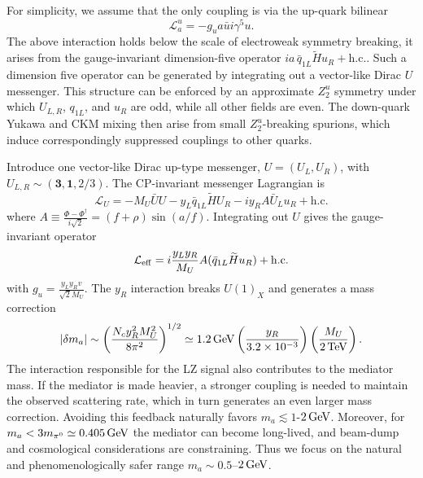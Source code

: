 \documentclass[notitlepage,floats,aps,nofootinbib,preprintnumbers,twocolumn,prl,10pt,balancelastpage]{revtex4-1}
\def\beq{\begin{equation}\begin{aligned}}
\def\eeq{\end{aligned}\end{equation}}
\newcommand{\Lag}{\mathcal L}
\begin{document}
For simplicity, we assume that the only coupling is via the up-quark bilinear
\begin{equation}
 \Lag_a^u=-g_u a\bar u i\gamma^5u.
 \label{eq:uonly}
\end{equation}
%
The above interaction holds below the scale of electroweak symmetry breaking, it arises from the gauge-invariant dimension-five operator \(ia\,\bar q_{1L}\widetilde H u_R+\mathrm{h.c.}\). Such a dimension five operator can be generated by integrating out a vector-like Dirac \(U\) messenger.
%
%
This structure can be enforced by an approximate $Z_2^u$ symmetry under
which $U_{L,R}$, $q_{1L}$, and $u_R$ are odd, while all other fields are
even.  The down-quark Yukawa and CKM mixing then arise from small
$Z_2^u$-breaking spurions, which induce correspondingly suppressed
couplings to other quarks.


Introduce one vector-like Dirac up-type messenger,
$U=(U_L,U_R)$, with $U_{L,R}\sim(\bm3,\bm1,2/3)$.
The CP-invariant messenger Lagrangian is
\begin{equation}
 \Lag_U=-M_U\bar UU-y_L\bar q_{1L}\widetilde H U_R
 -iy_RA\bar U_Lu_R+\mathrm{h.c.}
 \label{eq:messenger}
\end{equation}
where
$ A\equiv\frac{\Phi-\Phi^\dagger}{i\sqrt2}
 =(f+\rho)\sin(a/f)$.
Integrating out $U$ gives the gauge-invariant operator
\beq
 \Lag_{\rm eff}=i\frac{y_Ly_R}{M_U}A
 (\bar q_{1L}\widetilde Hu_R)+\mathrm{h.c.}
\eeq
with $g_u=\frac{y_Ly_Rv}{\sqrt2M_U}$.
%
%
The $y_R$ interaction breaks $U(1)_X$ and generates a mass correction
\begin{equation}
 |\delta m_a|\sim
 \left(\frac{N_cy_R^2M_U^2}{8\pi^2}\right)^{1/2}
 \simeq1.2\,{\rm GeV}
 \left(\frac{y_R}{3.2\times10^{-3}}\right)
 \left(\frac{M_U}{2\,{\rm TeV}}\right).
 \label{eq:visiblemass}
\end{equation}
The interaction responsible for the LZ signal also contributes to the
mediator mass.  If the mediator is made heavier, a stronger coupling is
needed to maintain the observed scattering rate, which in turn generates an
even larger mass correction.  Avoiding this feedback naturally favors
$m_a\lesssim1$-$2\,{\rm GeV}$.  Moreover, for $m_a<3m_{\pi^0}\simeq0.405\,{\rm GeV}$ the mediator can become long-lived, and
beam-dump and cosmological considerations are constraining.  Thus we focus on the
natural and phenomenologically safer range $m_a\sim0.5$--$2\,{\rm GeV}$.
\end{document}
